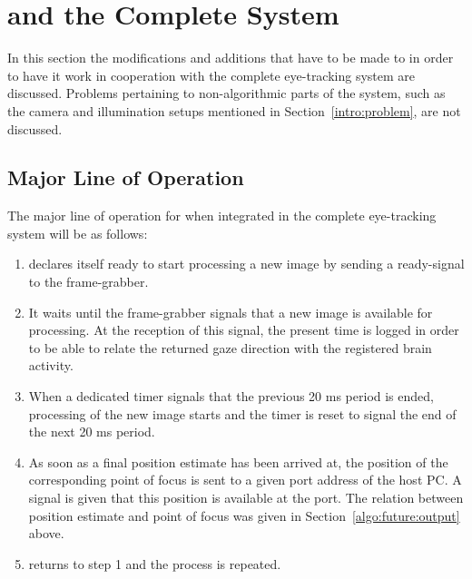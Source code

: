 
\section{{\octopus} and the Complete System}
\label{algo:future}

In this section the modifications and additions that have to be made
to {\octopus} in order to have it work in cooperation with the
complete eye-tracking system are discussed.  Problems pertaining to
non-algorithmic parts of the system, such as the camera and
illumination setups mentioned in Section~\ref{intro:problem}, are not
discussed.

\subsection{Major Line of Operation}
\label{algo:future:line}

The major line of operation for {\octopus} when integrated in the
complete eye-tracking system will be as follows: 

\begin{enumerate}
\item {\octopus} declares itself ready to start processing a new
  image by sending a ready-signal to the frame-grabber.
\item It waits until the frame-grabber signals that a new image is
  available for processing.  At the reception of this signal, the
  present time is logged in order to be able to relate the returned
  gaze direction with the registered brain activity.
\item When a dedicated timer signals that the previous 20 ms period is
  ended, processing of the new image starts and the timer is reset to
  signal the end of the next 20 ms period.
\item As soon as a final position estimate has been arrived at, the
  position of the corresponding point of focus is sent to a given port
  address of the host PC.  A signal is given that this position is
  available at the port.  The relation between position estimate and
  point of focus was given in Section~\ref{algo:future:output} above.
\item {\octopus} returns to step 1 and the process is repeated.
\end{enumerate}

